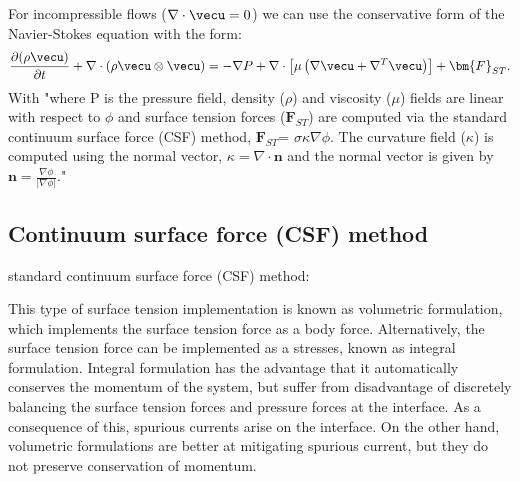 \documentclass{article}
\begin{document}
For incompressible flows ($\nabla \cdot \vecu = 0$) we can use the conservative form of the Navier-Stokes equation with the form:
\begin{equation}
    \frac{\partial (\rho \vecu)}{\partial t} + \nabla \cdot \left(\rho \vecu \otimes \vecu \right) = -\nabla P + \nabla \cdot \left[\mu \left(\nabla \vecu + \nabla^T \vecu \right) \right] + \bm{F}_{ST}.
    \label{eq:MTE_noS}
\end{equation}
With 
"where P is the pressure field, density ($\rho$) and viscosity ($\mu$) fields are linear with respect to $\phi$ and surface tension forces ($\bm{F}_{ST}$) are computed via the standard continuum surface force (CSF) method, $\bm{F}_{ST}$= $\sigma \kappa\nabla \phi$. The curvature field ($\kappa$) is computed using the normal vector, $\kappa = \nabla \cdot \bm{n}$  and the normal vector is given by $\bm{n} = \frac{\nabla \phi}{|\nabla \phi | }$."\\
\subsection{Continuum surface force (CSF) method}
standard continuum surface force (CSF) method:

This type of surface tension implementation is known as volumetric formulation, which implements the surface tension force as a body force. Alternatively, the surface tension force can be implemented as a stresses, known as integral formulation.
Integral formulation has the advantage that it automatically conserves the momentum of the system, but suffer from disadvantage of discretely balancing the surface tension forces and pressure forces at the interface. As a consequence of this, spurious currents arise on the interface.
On the other hand, volumetric formulations are better at mitigating spurious current, but they do not preserve conservation of momentum. 
\end{document}
